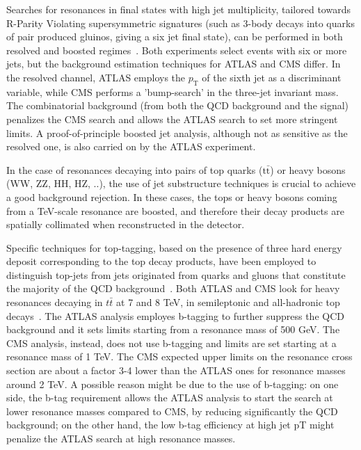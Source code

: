 \documentclass{PoS}
\begin{document}

Searches for resonances in final states with high jet multiplicity, tailored towards R-Parity Violating supersymmetric 
signatures (such as 3-body decays into quarks of pair produced gluinos, giving a six jet final state), can be performed in both resolved and boosted regimes~\cite{Chatrchyan2012329,SUSYRPVATLAS}.
Both experiments select events with six or more jets, but the background estimation techniques 
for ATLAS and CMS differ. In the resolved channel, ATLAS employs the $p_\mathrm{T}$
of the sixth jet as a discriminant variable, while CMS performs a 'bump-search' in the 
three-jet invariant mass. The combinatorial background (from both the QCD background and the signal)
penalizes the CMS search and allows the ATLAS search to set more stringent limits. A proof-of-principle
boosted jet analysis, although not as sensitive as the resolved one, is also carried on by the ATLAS experiment. 
 
In the case of resonances decaying into pairs of top quarks ($\mbox{t}\bar{\mbox{t}}$) or heavy bosons (WW, ZZ, HH, HZ, ..), 
the use of jet substructure techniques is crucial to achieve a good background rejection. 
In these cases, the tops or heavy bosons coming from a TeV-scale resonance 
are boosted, and therefore their decay products are spatially collimated when reconstructed in the detector.  

Specific techniques for top-tagging, based on the presence of three hard energy deposit corresponding
to the top decay products, have been employed to distinguish top-jets from jets originated from quarks and gluons
that constitute the majority of the QCD background~\cite{Kaplan:2008ie, Plehn:2010st, ATLAS-CONF-2012-065, Almeida:2010pa}. 
Both ATLAS and CMS look for heavy resonances decaying in $t\bar{t}$ at 7 and 8 TeV, in semileptonic and all-hadronic top decays~\cite{TtbarResCMS, TtbarResATLAS, CMS-PAS-B2G-12-005, ATLAS-CONF-2013-052, CMS-PAS-B2G-12-006}.
The ATLAS analysis employes b-tagging to further suppress the QCD background and it sets limits starting from a resonance mass of 500 GeV. The CMS analysis, instead, does not use b-tagging and limits are set starting at a resonance mass of 1 TeV. 
The CMS expected upper limits on the resonance cross section are about a factor 3-4 lower than the ATLAS ones for resonance masses around 2 TeV.  A possible reason might be due to the use of b-tagging: on one side, the b-tag requirement allows the ATLAS analysis to start the search at lower resonance masses compared to CMS, by reducing significantly the QCD background; 
on the other hand, the low b-tag efficiency at high jet pT might penalize the ATLAS search at high resonance masses.
\end{document}
